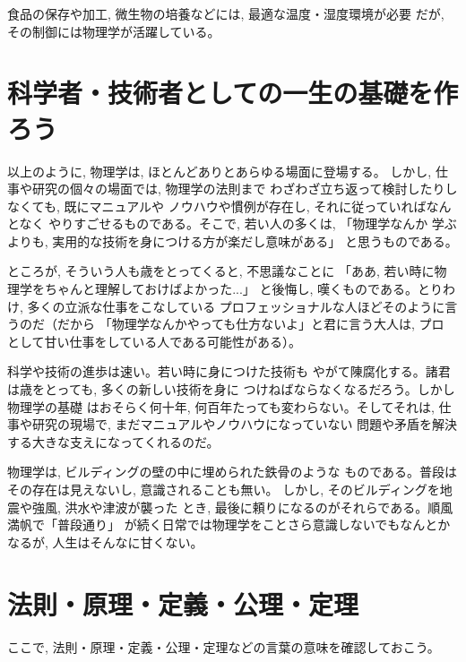 食品の保存や加工, 微生物の培養などには, 最適な温度・湿度環境が必要
だが, その制御には物理学が活躍している。
\hv

\section{科学者・技術者としての一生の基礎を作ろう}

以上のように, 物理学は, ほとんどありとあらゆる場面に登場する。
しかし, 仕事や研究の個々の場面では, 物理学の法則まで
わざわざ立ち返って検討したりしなくても, 既にマニュアルや
ノウハウや慣例が存在し, それに従っていればなんとなく
やりすごせるものである。そこで, 若い人の多くは, 「物理学なんか
学ぶよりも, 実用的な技術を身につける方が楽だし意味がある」
と思うものである。

ところが, そういう人も歳をとってくると, 不思議なことに
「ああ, 若い時に物理学をちゃんと理解しておけばよかった...」
と後悔し, 嘆くものである。とりわけ, 多くの立派な仕事をこなしている
プロフェッショナルな人ほどそのように言うのだ（だから
「物理学なんかやっても仕方ないよ」と君に言う大人は, プロ
として甘い仕事をしている人である可能性がある）。

科学や技術の進歩は速い。若い時に身につけた技術も
やがて陳腐化する。諸君は歳をとっても, 多くの新しい技術を身に
つけねばならなくなるだろう。しかし物理学の基礎
はおそらく何十年, 何百年たっても変わらない。そしてそれは, 
仕事や研究の現場で, まだマニュアルやノウハウになっていない
問題や矛盾を解決する大きな支えになってくれるのだ。

物理学は, ビルディングの壁の中に埋められた鉄骨のような
ものである。普段はその存在は見えないし, 意識されることも無い。
しかし, そのビルディングを地震や強風, 洪水や津波が襲った
とき, 最後に頼りになるのがそれらである。順風満帆で「普段通り」
が続く日常では物理学をことさら意識しないでもなんとかなるが, 
人生はそんなに甘くない。
\hv


\section{法則・原理・定義・公理・定理}

ここで, 法則・原理・定義・公理・定理などの言葉の意味を確認しておこう。

